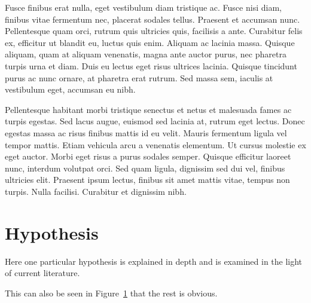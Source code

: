 Fusce finibus erat nulla, eget vestibulum diam tristique ac. Fusce nisi diam, finibus vitae fermentum nec, placerat sodales tellus. Praesent et accumsan nunc. Pellentesque quam orci, rutrum quis ultricies quis, facilisis a ante. Curabitur felis ex, efficitur ut blandit eu, luctus quis enim. Aliquam ac lacinia massa. Quisque aliquam, quam at aliquam venenatis, magna ante auctor purus, nec pharetra turpis urna et diam. Duis eu lectus eget risus ultrices lacinia. Quisque tincidunt purus ac nunc ornare, at pharetra erat rutrum. Sed massa sem, iaculis at vestibulum eget, accumsan eu nibh.

Pellentesque habitant morbi tristique senectus et netus et malesuada fames ac turpis egestas. Sed lacus augue, euismod sed lacinia at, rutrum eget lectus. Donec egestas massa ac risus finibus mattis id eu velit. Mauris fermentum ligula vel tempor mattis. Etiam vehicula arcu a venenatis elementum. Ut cursus molestie ex eget auctor. Morbi eget risus a purus sodales semper. Quisque efficitur laoreet nunc, interdum volutpat orci. Sed quam ligula, dignissim sed dui vel, finibus ultricies elit. Praesent ipsum lectus, finibus sit amet mattis vitae, tempus non turpis. Nulla facilisi. Curabitur et dignissim nibh.


\section{Hypothesis}

Here one particular hypothesis is explained in depth
and is examined in the light of current literature.

This can also be seen in Figure~\ref{moon} that the
rest is obvious.

\begin{figure}[h!tb] \centering

\vspace{ 2 in}
\label{moon}
\end{figure}

